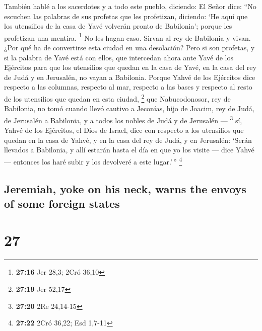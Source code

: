 \begin{paracol}{2}
 También hablé a los sacerdotes y a todo este pueblo,
diciendo: El Señor dice: ``No escuchen las palabras de sus profetas que
les profetizan, diciendo: `He aquí que los utensilios de la casa de Yavé
volverán pronto de Babilonia'; porque les profetizan una mentira.
\footnote{\textbf{27:16} Jer 28,3; 2Cró 36,10}  No les
hagan caso. Sirvan al rey de Babilonia y vivan. ¿Por qué ha de
convertirse esta ciudad en una desolación?  Pero si son
profetas, y si la palabra de Yavé está con ellos, que intercedan ahora
ante Yavé de los Ejércitos para que los utensilios que quedan en la casa
de Yavé, en la casa del rey de Judá y en Jerusalén, no vayan a
Babilonia.  Porque Yahvé de los Ejércitos dice respecto a
las columnas, respecto al mar, respecto a las bases y respecto al resto
de los utensilios que quedan en esta ciudad, \footnote{\textbf{27:19}
  Jer 52,17}  que Nabucodonosor, rey de Babilonia, no
tomó cuando llevó cautivo a Jeconías, hijo de Joacim, rey de Judá, de
Jerusalén a Babilonia, y a todos los nobles de Judá y de Jerusalén ---
\footnote{\textbf{27:20} 2Re 24,14-15}  sí, Yahvé de los
Ejércitos, el Dios de Israel, dice con respecto a los utensilios que
quedan en la casa de Yahvé, y en la casa del rey de Judá, y en
Jerusalén:  `Serán llevados a Babilonia, y allí estarán
hasta el día en que yo los visite --- dice Yahvé --- entonces los haré
subir y los devolveré a este lugar.'\,'' \footnote{\textbf{27:22} 2Cró
  36,22; Esd 1,7-11}

\switchcolumn
\begin{otherlanguage}{english}

\hypertarget{jeremiah-yoke-on-his-neck-warns-the-envoys-of-some-foreign-states}{%
\subsection{Jeremiah, yoke on his neck, warns the envoys of some foreign
states}\label{jeremiah-yoke-on-his-neck-warns-the-envoys-of-some-foreign-states}}

\hypertarget{section-53}{%
\section{27}\label{section-53}}


\end{otherlanguage}
\end{paracol}
